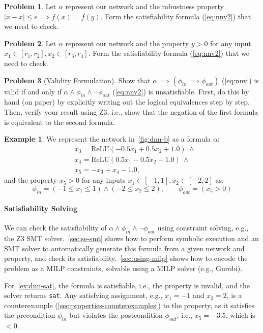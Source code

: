 \documentclass[oneside,11pt,dvipsnames]{book}
\numberwithin{equation}{section}
\theoremstyle{definition}
\newtheorem{example}{Example}[section]
\newtheorem{problem}{Problem}[section]
\theoremstyle{remark}
\newcommand{\relu}[1]{\mathrm{ReLU}\left(#1\right)}
\newcommand{\sat}{\texttt{sat}}
\begin{document}
\begin{problem}\label{ex:prop-neg1}
  Let $\alpha$ represent our network and the robustness property $| x - x | \le \epsilon \implies  f(x) = f(y)$. Form the satisfiability formula (\autoref{eq:nnv2}) that we need to check.
\end{problem}


\begin{problem}\label{ex:prop-neg2}
  Let $\alpha$ represent our network and the property $y>0$ for any input $x_1 \in [r_1,r_2], x_2 \in [r_3,r_4]$. Form the satisfiability formula (\autoref{eq:nnv2}) that we need to check.
\end{problem}

\begin{problem}[Validity Formulation]\label{ex:negation-trick}
Show that $\alpha \implies (\phi_{in} \implies \phi_{out})$ (\autoref{eq:nnv}) is valid if and only if $\alpha \land \phi_{in} \land \neg \phi_{out}$ (\autoref{eq:nnv2}) is unsatisfiable.
First, do this by hand (on paper) by explicitly writing out the logical equivalences step by step. Then, verify your result using Z3, i.e., show that the negation of the first formula is equivalent to the second formula.
\end{problem}

\begin{example}\label{ex:dnn-sat}
We represent the network in~\autoref{fig:dnn-b} as a formula $\alpha$:
\begin{align*}
& x_3 = \relu{-0.5x_1 + 0.5x_2 + 1.0}  ~\land \\
& x_4 = \relu{0.5x_1 - 0.5x_2 - 1.0}  ~\land \\
& x_5 = -x_3 + x_4 - 1.0,
\end{align*}
\noindent and the property $x_5 > 0$ for any inputs $x_1 \in [-1,1], x_2\in[-2,2]$ as:
\begin{equation*}
\phi_{in} = (-1 \le x_1 \le 1) \land (-2 \le x_2 \le 2); \qquad
\phi_{out} = (x_5 > 0)
\end{equation*}

\paragraph{Satisfiability Solving} We can check the satisfiability of $\alpha \land \phi_{in} \land \neg \phi_{out}$ using constraint solving, e.g., the Z3 SMT solver.~\autoref{sec:se-smt} shows how to perform symbolic execution and an SMT solver to automatically generate this formula from a given network and property, and check its satisfiability.~\autoref{sec:using-milp} shows how to encode the problem as a MILP constraints, solvable using a MILP solver (e.g., Gurobi).

For~\autoref{ex:dnn-sat}, the formula is satisfiable, i.e., the property is invalid, and the solver returns \sat{}.  Any satisfying assignment, e.g., $x_1=-1$ and $x_2=2$, is a counterexample (\autoref{sec:properties-counterexamples}) to the property, as it satisfies the precondition $\phi_{in}$ but violates the postcondition $\phi_{out}$, i.e., $x_5 = -3.5$, which is  $< 0$.
\end{example}
\end{document}
